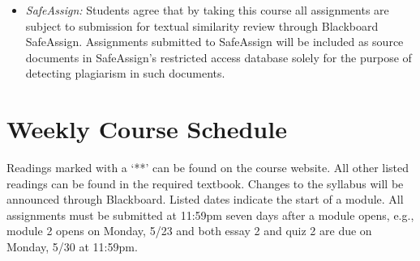 \documentclass[article,oneside]{memoir}
\begin{document}
\begin{itemize}
\item \textit{SafeAssign:} Students agree that by taking this course all assignments are subject to submission for textual similarity review through Blackboard SafeAssign. Assignments submitted to SafeAssign will be included as source documents in SafeAssign's restricted access database solely for the purpose of detecting plagiarism in such documents.  


\end{itemize}



\section{Weekly Course Schedule}
Readings marked with a `**' can be found on the course website. All other listed readings can be found in the required textbook. Changes to the syllabus will be announced through Blackboard. Listed dates indicate the start of a module.  All assignments must be submitted at 11:59pm seven days after a module opens, e.g., module 2 opens on Monday, 5/23 and both essay 2 and quiz 2 are due on Monday, 5/30 at 11:59pm.  \newline
\end{document}
